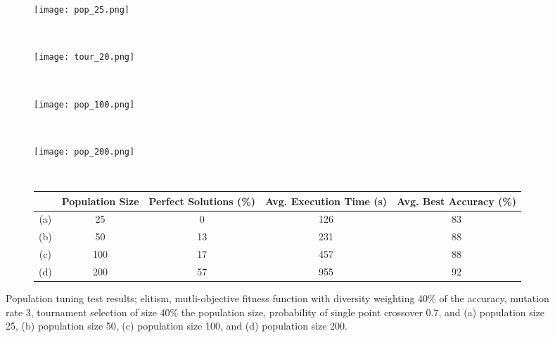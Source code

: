 \begin{figure}
	\centering
	\begin{subfigure}[ht]{0.49\textwidth}
		\texttt{[image: pop\_25.png]}
		\caption{}
		\label{fig:pop_25}
		\vspace{1em}
	\end{subfigure}
	~
	\begin{subfigure}[ht]{0.49\textwidth}
		\texttt{[image: tour\_20.png]}
		\caption{}
		\vspace{1em}
	\end{subfigure}
	~
	\begin{subfigure}[ht]{0.49\textwidth}
		\texttt{[image: pop\_100.png]}
		\caption{}
		\vspace{1em}
		\label{fig:pop_100}
	\end{subfigure}
	~
	\begin{subfigure}[ht]{0.49\textwidth}
		\texttt{[image: pop\_200.png]}
		\caption{}
		\label{fig:pop_200}
		\vspace{1em}
	\end{subfigure}
	~
	\begin{subfigure}[ht]{\textwidth}
		\centering
		\begin{tabular}{ccccc}
			\toprule
			& \bfseries{Population Size} &
			\bfseries{Perfect Solutions (\%)} &
			\bfseries{Avg. Execution Time (s)} & \bfseries{Avg. Best Accuracy (\%)}\\
			\midrule
			(a) & 25 & 0 & 126 & 83\\
			(b) & 50 & 13 & 231 & 88\\
			(c) & 100 & 17 & 457 & 88\\
			(d) & 200 & 57 & 955 & 92\\
			\bottomrule
		\end{tabular}
	\end{subfigure}

	\caption[Population tuning test results]{Population tuning test results;
	elitism, mutli-objective fitness function with diversity weighting 40\%
	of the accuracy, mutation rate 3, tournament selection of size 40\%
	the population size, probability of single point crossover 0.7, and
	(a) population size 25, (b) population size 50, (c) population size 100,
	and (d) population size 200.}
	\label{fig:pop}
\end{figure}

